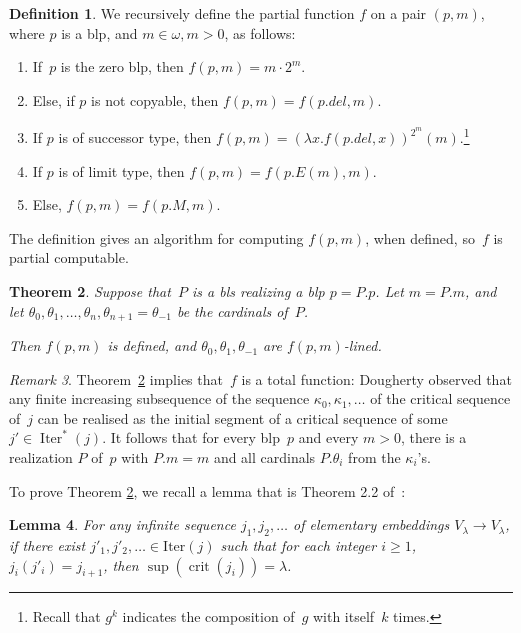 \documentclass{article}
\newtheorem{lemma}{Lemma}[section]
\newtheorem{theorem}[lemma]{Theorem}
\theoremstyle{definition}
\newtheorem{definition}[lemma]{Definition}
\theoremstyle{remark}
\newtheorem{remark}[lemma]{Remark}
\DeclareMathOperator{\crit}{crit}
\DeclareMathOperator{\Iter}{Iter}
\begin{document}
\begin{definition} \label{def:the_f_function}
    We recursively define the partial function $f$ on a pair $(p,m)$, where $p$ is a blp, and $m\in \omega, m>0$, as follows:
    \begin{enumerate}
    \item If~$p$ is the zero blp, then $f(p,m)=m\cdot 2^m$.
    \item Else, if $p$ is not copyable, then $f(p,m)=f(p.del,m)$.
    \item If $p$ is of successor type, then $f(p,m)=(\lambda x.f(p.del,x))^{2^m}(m)$.\footnote{Recall that $g^k$ indicates the composition of~$g$ with itself~$k$ times.}
    \item If $p$ is of limit type, then $f(p,m)=f(p.E(m),m)$.
    \item Else, $f(p,m)=f(p.M,m)$.
    \end{enumerate}
\end{definition}

The definition gives an algorithm for computing $f(p,m)$, when defined, so~$f$ is partial computable. 

\begin{theorem} \label{thm:f_is_lower_bound}
  Suppose that~$P$ is a bls realizing a blp $p = P.p$. Let $m  = P.m$, and let $\theta_0,\theta_1,\dots,\theta_n, \theta_{n+1} = \theta_{-1}$ be the cardinals of~$P$. 

  Then $f(p,m)$ is defined, and $\theta_0,\theta_1,\theta_{-1}$ are $f(p,m)$-lined. 
\end{theorem}

\begin{remark} \label{rmk:f_is_total}
  Theorem~\ref{thm:f_is_lower_bound} implies that~$f$ is a total function: Dougherty \cite{Dougherty} observed that any finite increasing subsequence of the sequence $\kappa_0,\kappa_1,\dots$ of the critical sequence of~$j$ can be realised as the initial segment of a critical sequence of some $j'\in \Iter^*(j)$. It follows that for every blp~$p$ and every $m>0$, there is a realization $P$ of~$p$ with $P.m=m$ and all cardinals $P.\theta_i$ from the $\kappa_i$'s. 
\end{remark}



To prove Theorem \ref{thm:f_is_lower_bound}, we recall a lemma that is Theorem 2.2 of~\cite{Dougherty2}:

\begin{lemma} \label{lem:sup_crit}
    For any infinite sequence $j_1, j_2, \dots$ of elementary embeddings $V_\lambda\rightarrow V_\lambda$, if there exist $j'_1, j'_2, \dots \in \mathrm{Iter}(j)$ such that for each integer $i \ge 1$, $j_i(j'_i) = j_{i+1}$, then $\sup(\crit(j_i)) = \lambda$.
\end{lemma}
\end{document}
